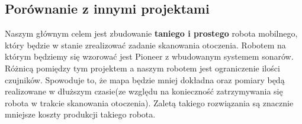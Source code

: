 \subsection{Porównanie z innymi projektami}
Naszym głównym celem jest zbudowanie \textbf{taniego i prostego} robota mobilnego, który będzie w stanie zrealizować zadanie skanowania otoczenia. Robotem na którym będziemy się wzorować jest Pioneer z wbudowanym systemem sonarów. Różnicą pomiędzy tym projektem a naszym robotem jest ograniczenie ilości czujników. Spowoduje to, że mapa będzie mniej dokładna oraz pomiary będą realizowane w dłuższym czasie(ze względu na konieczność zatrzymywania się robota w trakcie skanowania otoczenia). Zaletą takiego rozwiązania są znacznie mniejsze koszty produkcji takiego robota.